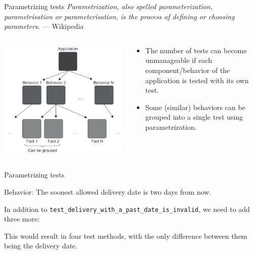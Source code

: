 \documentclass[english,handout,10pt,aspectratio=169,t]{beamer}
\begin{document}
\begin{frame}{Parametrizing tests}
  \footnotesize{\textit{Parametrization, also spelled parameterization, parametrisation
  or parameterisation, is the process of defining or choosing parameters.} --- Wikipedia}
  \begin{columns}[T]
    \begin{column}[]{0.5\textwidth}
      \begin{minipage}{\linewidth}
        \includegraphics[width=\textwidth]{images/parametrized_tests.png}
      \end{minipage}
    \end{column}
    \begin{column}[]{0.5\textwidth}
      \begin{itemize}
        \item The number of tests can become unmanageable if each component/behavior
        of the application is tested with its own test.
        \item Some (similar) behaviors can be grouped into a single test using
        parametrization.
      \end{itemize}
    \end{column}
  \end{columns}
\end{frame}

\begin{frame}{Parametrizing tests}
  \begin{minipage}{\textwidth}
    Behavior: The soonest allowed delivery date is two days from now. 
  \end{minipage}
  \vfill
  \begin{minipage}{\textwidth}
    In addition to \texttt{test\_delivery\_with\_a\_past\_date\_is\_invalid}, we
    need to add three more:

    \additionalbehavior

    This would result in four test methods, with the only difference between them
    being the delivery date.
  \end{minipage}
\end{frame}
\end{document}
